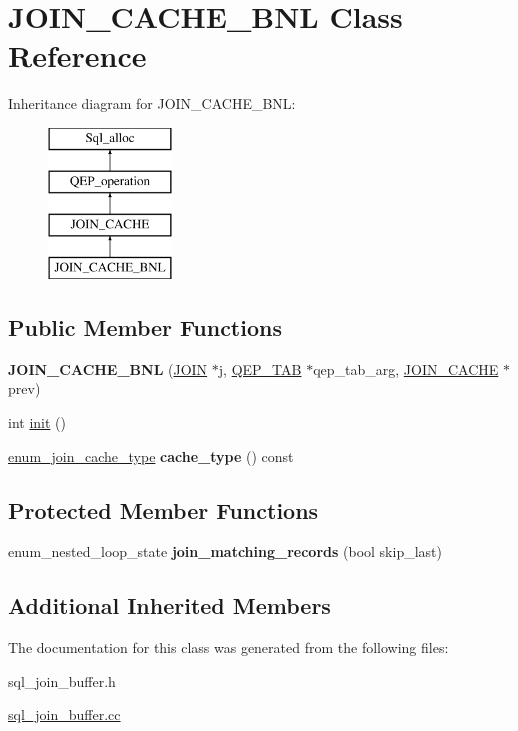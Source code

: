 \hypertarget{classJOIN__CACHE__BNL}{}\section{J\+O\+I\+N\+\_\+\+C\+A\+C\+H\+E\+\_\+\+B\+NL Class Reference}
\label{classJOIN__CACHE__BNL}
Inheritance diagram for J\+O\+I\+N\+\_\+\+C\+A\+C\+H\+E\+\_\+\+B\+NL\+:\begin{figure}[H]
\begin{center}
\leavevmode
\includegraphics[height=4.000000cm]{classJOIN__CACHE__BNL}
\end{center}
\end{figure}
\subsection*{Public Member Functions}
\begin{DoxyCompactItemize}
\item 
\mbox{\label{classJOIN__CACHE__BNL_a10f969451f8fbafcb43818c24a4c3516}} 
{\bfseries J\+O\+I\+N\+\_\+\+C\+A\+C\+H\+E\+\_\+\+B\+NL} (\mbox{\hyperlink{classJOIN}{J\+O\+IN}} $\ast$j, \mbox{\hyperlink{classQEP__TAB}{Q\+E\+P\+\_\+\+T\+AB}} $\ast$qep\+\_\+tab\+\_\+arg, \mbox{\hyperlink{classJOIN__CACHE}{J\+O\+I\+N\+\_\+\+C\+A\+C\+HE}} $\ast$prev)
\item 
int \mbox{\hyperlink{group__Query__Optimizer_gab3dbb0f8b69dc30985e0d9a0ff94121f}{init}} ()
\item 
\mbox{\label{classJOIN__CACHE__BNL_a76406ff21fc8e786e6830eba0c9f4944}} 
\mbox{\hyperlink{classJOIN__CACHE_a74b45254b4573b9531f1b8b536b18e46}{enum\+\_\+join\+\_\+cache\+\_\+type}} {\bfseries cache\+\_\+type} () const
\end{DoxyCompactItemize}
\subsection*{Protected Member Functions}
\begin{DoxyCompactItemize}
\item 
enum\+\_\+nested\+\_\+loop\+\_\+state {\bfseries join\+\_\+matching\+\_\+records} (bool skip\+\_\+last)
\end{DoxyCompactItemize}
\subsection*{Additional Inherited Members}


The documentation for this class was generated from the following files\+:\begin{DoxyCompactItemize}
\item 
sql\+\_\+join\+\_\+buffer.\+h\item 
\mbox{\hyperlink{sql__join__buffer_8cc}{sql\+\_\+join\+\_\+buffer.\+cc}}\end{DoxyCompactItemize}

